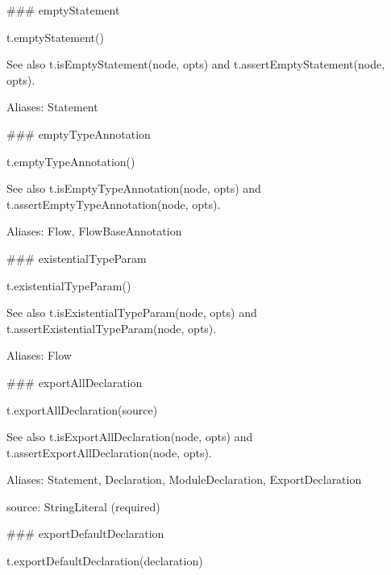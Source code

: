 \#\#\# empty\+Statement 
\begin{DoxyCode}
t.emptyStatement()
\end{DoxyCode}


See also {\ttfamily t.\+is\+Empty\+Statement(node, opts)} and {\ttfamily t.\+assert\+Empty\+Statement(node, opts)}.

Aliases\+: {\ttfamily Statement}





\#\#\# empty\+Type\+Annotation 
\begin{DoxyCode}
t.emptyTypeAnnotation()
\end{DoxyCode}


See also {\ttfamily t.\+is\+Empty\+Type\+Annotation(node, opts)} and {\ttfamily t.\+assert\+Empty\+Type\+Annotation(node, opts)}.

Aliases\+: {\ttfamily Flow}, {\ttfamily Flow\+Base\+Annotation}





\#\#\# existential\+Type\+Param 
\begin{DoxyCode}
t.existentialTypeParam()
\end{DoxyCode}


See also {\ttfamily t.\+is\+Existential\+Type\+Param(node, opts)} and {\ttfamily t.\+assert\+Existential\+Type\+Param(node, opts)}.

Aliases\+: {\ttfamily Flow}





\#\#\# export\+All\+Declaration 
\begin{DoxyCode}
t.exportAllDeclaration(source)
\end{DoxyCode}


See also {\ttfamily t.\+is\+Export\+All\+Declaration(node, opts)} and {\ttfamily t.\+assert\+Export\+All\+Declaration(node, opts)}.

Aliases\+: {\ttfamily Statement}, {\ttfamily Declaration}, {\ttfamily Module\+Declaration}, {\ttfamily Export\+Declaration}


\begin{DoxyItemize}
\item {\ttfamily source}\+: {\ttfamily String\+Literal} (required) 


\end{DoxyItemize}

\#\#\# export\+Default\+Declaration 
\begin{DoxyCode}
t.exportDefaultDeclaration(declaration)
\end{DoxyCode}


